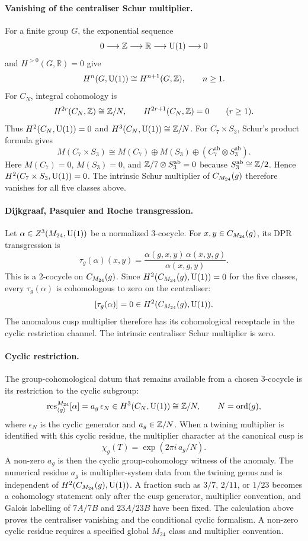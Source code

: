 \paragraph{Vanishing of the centraliser Schur multiplier.}
For a finite group \(G\), the exponential sequence
\[
0\longrightarrow \mathbb{Z} \longrightarrow \mathbb{R}\longrightarrow \mathrm{U}\!\left(1\right)
\longrightarrow 0
\]
and \(H^{>0}(G,\mathbb{R})=0\) give
\[
H^n(G,\mathrm{U}\!\left(1\right))\cong H^{n+1}(G,\mathbb{Z}),\qquad n\geq 1.
\]
For \(C_N\), integral cohomology is
\[
H^{2r}(C_N,\mathbb{Z})\cong \mathbb{Z}/N,\qquad
H^{2r+1}(C_N,\mathbb{Z})=0\qquad (r\geq 1).
\]
Thus \(H^2(C_N,\mathrm{U}\!\left(1\right))=0\) and \(H^3(C_N,\mathrm{U}\!\left(1\right))\cong \mathbb{Z}/N\).
For \(C_7\times S_3\), Schur's product formula gives
\[
M(C_7\times S_3)
 \cong M(C_7)\oplus M(S_3)\oplus
 (C_7^{\mathrm{ab}}\otimes S_3^{\mathrm{ab}}).
\]
Here \(M(C_7)=0\), \(M(S_3)=0\), and
\(\mathbb{Z}/7\otimes S_3^{\mathrm{ab}}=0\) because
\(S_3^{\mathrm{ab}}\cong\mathbb{Z}/2\).  Hence \(H^2(C_7\times S_3,\mathrm{U}\!\left(1\right))=0\).
The intrinsic Schur multiplier of \(C_{M_{24}}(g)\) therefore vanishes for all
five classes above.

\paragraph{Dijkgraaf, Pasquier and Roche transgression.}
Let \(\alpha\in Z^3(M_{24},\mathrm{U}\!\left(1\right))\) be a normalized \(3\)-cocycle.  For
\(x,y\in C_{M_{24}}(g)\), its DPR transgression is
\[
\tau_g(\alpha)(x,y)
 =
 \frac{\alpha(g,x,y)\,\alpha(x,y,g)}{\alpha(x,g,y)}.
\]
This is a \(2\)-cocycle on \(C_{M_{24}}(g)\).  Since \(H^2(C_{M_{24}}(g),\mathrm{U}\!\left(1\right))=0\) for the
five classes, every \(\tau_g(\alpha)\) is cohomologous to zero on the
centraliser:
\[
[\tau_g(\alpha)]=0\in H^2(C_{M_{24}}(g),\mathrm{U}\!\left(1\right)).
\]
The anomalous cusp multiplier therefore has its cohomological receptacle
in the cyclic restriction channel.  The intrinsic centraliser Schur
multiplier is zero.

\paragraph{Cyclic restriction.}
The group-cohomological datum that remains available from a chosen
\(3\)-cocycle is its restriction to the cyclic subgroup:
\[
\operatorname{res}^{M_{24}}_{\langle g\rangle}[\alpha]
 =
a_g\,\epsilon_N
\in H^3(C_N,\mathrm{U}\!\left(1\right))\cong \mathbb{Z}/N,
\qquad N=\operatorname{ord}(g),
\]
where \(\epsilon_N\) is the cyclic generator and \(a_g\in\mathbb{Z}/N\).  When a
twining multiplier is identified with this cyclic residue, the multiplier
character at the canonical cusp is
\[
\chi_g(T)=\exp(2\pi i\,a_g/N).
\]
A non-zero \(a_g\) is then the cyclic group-cohomology witness of the
anomaly.  The numerical residue \(a_g\) is multiplier-system data from
the twining genus and is independent of \(H^2(C_{M_{24}}(g),\mathrm{U}\!\left(1\right))\).  A fraction
such as \(3/7\), \(2/11\), or \(1/23\) becomes a cohomology statement
only after the cusp generator, multiplier convention, and Galois
labelling of \(7A/7B\) and \(23A/23B\) have been fixed.  The calculation
above proves the centraliser vanishing and the conditional cyclic
formalism.  A non-zero cyclic residue requires a specified global
\(M_{24}\) class and multiplier convention.

